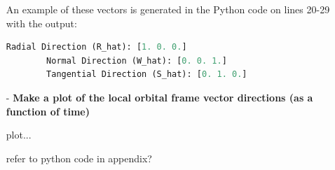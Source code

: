 \begin{itemize}
    An example of these vectors is generated in the Python code on lines 20-29 with the output:
    \begin{lstlisting}[frame=single, language=Python]
        Radial Direction (R_hat): [1. 0. 0.]
        Normal Direction (W_hat): [0. 0. 1.]
        Tangential Direction (S_hat): [0. 1. 0.]
    \end{lstlisting}

    
    
    \item[-] \textbf{Make a plot of the local orbital frame vector directions (as a function of time)}

    plot...

    refer to python code in appendix?

    

\end{itemize}